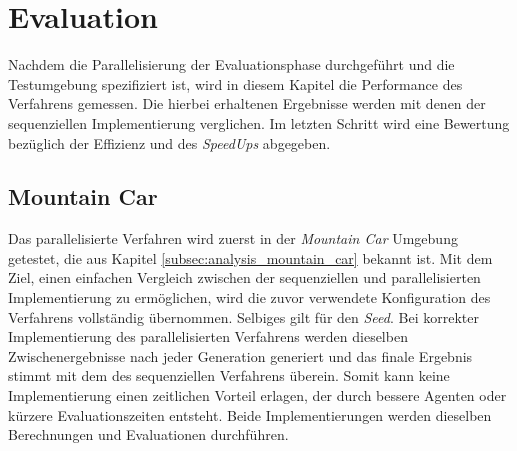 \section{Evaluation}
\label{sec:evaluation_parallel}
Nachdem die Parallelisierung der Evaluationsphase durchgeführt und die Testumgebung spezifiziert ist, wird in diesem Kapitel die Performance des Verfahrens gemessen. Die hierbei erhaltenen Ergebnisse werden mit denen der sequenziellen Implementierung verglichen. Im letzten Schritt wird eine Bewertung bezüglich der Effizienz und des \emph{SpeedUps} abgegeben.

\subsection{Mountain Car}
\label{subsec:mountain_car_optimzation}
Das parallelisierte Verfahren wird zuerst in der \emph{Mountain Car} Umgebung getestet, die aus Kapitel \ref{subsec:analysis_mountain_car} bekannt ist. Mit dem Ziel, einen einfachen Vergleich zwischen der sequenziellen und parallelisierten Implementierung zu ermöglichen, wird die zuvor verwendete Konfiguration des Verfahrens vollständig übernommen. Selbiges gilt für den \emph{Seed}. Bei korrekter Implementierung des parallelisierten Verfahrens werden dieselben Zwischenergebnisse nach jeder Generation generiert und das finale Ergebnis stimmt mit dem des sequenziellen Verfahrens überein. Somit kann keine Implementierung einen zeitlichen Vorteil erlagen, der durch bessere Agenten oder kürzere Evaluationszeiten entsteht. Beide Implementierungen werden dieselben Berechnungen und Evaluationen durchführen.

